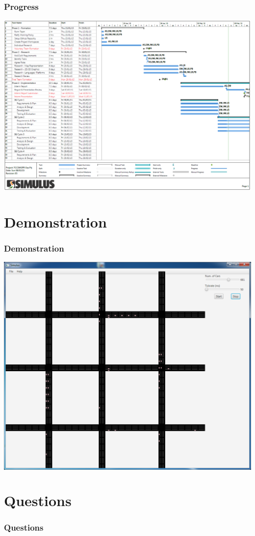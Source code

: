 \documentclass{beamer}
\begin{document}
\begin{frame}
\frametitle{Progress}
\includegraphics[scale=0.3]{gantt}
\end{frame}

\section{Demonstration}

\begin{frame}
\frametitle{Demonstration}
\includegraphics[scale=0.25]{screenshot}
\end{frame}

\section{Questions}

\begin{frame}
\frametitle{Questions}

\end{frame}
\end{document}
